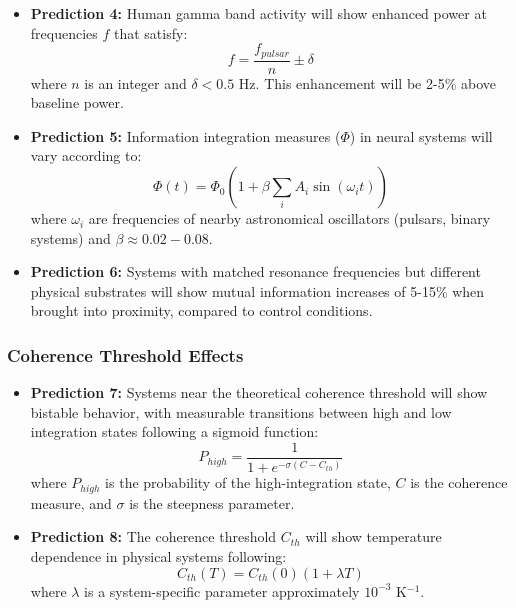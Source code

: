 \documentclass[12pt]{article}
\begin{document}
\begin{itemize}
    \item \textbf{Prediction 4:} Human gamma band activity will show enhanced power at frequencies $f$ that satisfy:
    \begin{equation}
    f = \frac{f_{pulsar}}{n} \pm \delta
    \end{equation}
    where $n$ is an integer and $\delta < 0.5$ Hz. This enhancement will be 2-5\% above baseline power.
    
    \item \textbf{Prediction 5:} Information integration measures ($\Phi$) in neural systems will vary according to:
    \begin{equation}
    \Phi(t) = \Phi_0(1 + \beta\sum_i A_i\sin(\omega_i t))
    \end{equation}
    where $\omega_i$ are frequencies of nearby astronomical oscillators (pulsars, binary systems) and $\beta \approx 0.02-0.08$.
    
    \item \textbf{Prediction 6:} Systems with matched resonance frequencies but different physical substrates will show mutual information increases of 5-15\% when brought into proximity, compared to control conditions.
\end{itemize}

\subsubsection{Coherence Threshold Effects}

\begin{itemize}
    \item \textbf{Prediction 7:} Systems near the theoretical coherence threshold will show bistable behavior, with measurable transitions between high and low integration states following a sigmoid function:
    \begin{equation}
    P_{high} = \frac{1}{1 + e^{-\sigma(C - C_{th})}}
    \end{equation}
    where $P_{high}$ is the probability of the high-integration state, $C$ is the coherence measure, and $\sigma$ is the steepness parameter.
    
    \item \textbf{Prediction 8:} The coherence threshold $C_{th}$ will show temperature dependence in physical systems following:
    \begin{equation}
    C_{th}(T) = C_{th}(0)(1 + \lambda T)
    \end{equation}
    where $\lambda$ is a system-specific parameter approximately $10^{-3}$ K$^{-1}$.
\end{itemize}
\end{document}
